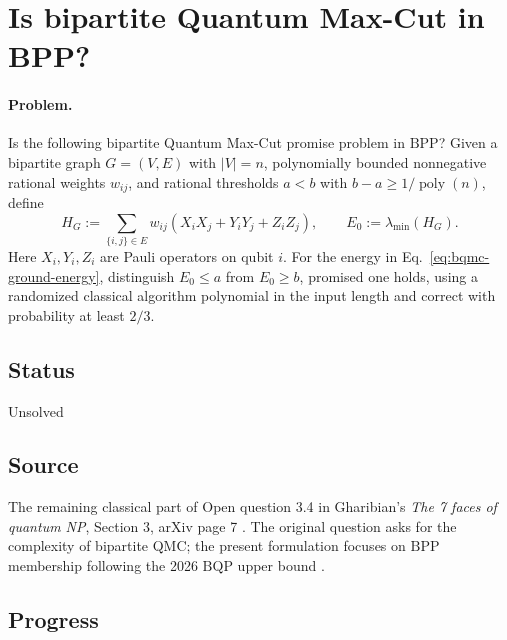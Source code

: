 \section{Is bipartite Quantum Max-Cut in BPP?}
\label{sec:op_1576e5f52f7ff3b2}

\paragraph{Problem.}
Is the following bipartite Quantum Max-Cut promise problem in
$\mathrm{BPP}$? Given a bipartite graph $G=(V,E)$ with $|V|=n$,
polynomially bounded nonnegative rational weights $w_{ij}$, and rational
thresholds $a<b$ with $b-a\geq1/\operatorname{poly}(n)$, define
\begin{equation}
  H_G:=\sum_{\{i,j\}\in E}w_{ij}(X_iX_j+Y_iY_j+Z_iZ_j),
  \qquad E_0:=\lambda_{\min}(H_G).
  \label{eq:bqmc-ground-energy}
\end{equation}
Here $X_i,Y_i,Z_i$ are Pauli operators on qubit $i$.
For the energy in Eq.~\eqref{eq:bqmc-ground-energy}, distinguish
$E_0\leq a$ from $E_0\geq b$, promised one holds, using a randomized
classical algorithm polynomial in the input length and correct with
probability at least $2/3$.

\subsection*{Status}

Unsolved

\subsection*{Source}

The remaining classical part of Open question 3.4 in Gharibian's
\emph{The 7 faces of quantum NP}, Section 3, arXiv page 7
.
The original question asks for the complexity of bipartite QMC;
the present formulation focuses on $\mathrm{BPP}$ membership following
the 2026 $\mathrm{BQP}$ upper bound .

\subsection*{Progress}

